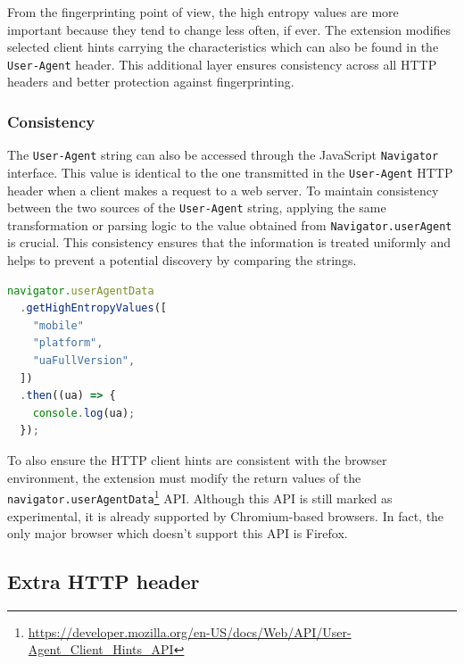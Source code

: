 From the fingerprinting point of view, the high entropy values are more important because they tend to change less often, if ever. The extension modifies selected client hints carrying the characteristics which can also be found in the \texttt{User-Agent} header. This additional layer ensures consistency across all HTTP headers and better protection against fingerprinting.

\subsubsection{Consistency}

The \texttt{User-Agent} string can also be accessed through the JavaScript \texttt{Navigator} interface. This value is identical to the one transmitted in the \texttt{User-Agent} HTTP header when a client makes a request to a web server. To maintain consistency between the two sources of the \texttt{User-Agent} string, applying the same transformation or parsing logic to the value obtained from \texttt{Navigator.userAgent} is crucial. This consistency ensures that the information is treated uniformly and helps to prevent a potential discovery by comparing the strings.

\bigbreak

\begin{lstlisting}[language={TypeScript}, caption={An example the User-Agent Client Hints API usage \cite{MDN}. This API call returns the same values as the HTTP client hints in example \ref{Listing:HTTPClientHintsExample}.}]
navigator.userAgentData
  .getHighEntropyValues([
    "mobile"
    "platform",
    "uaFullVersion",
  ])
  .then((ua) => {
    console.log(ua);
  });	
\end{lstlisting}

\medbreak

To also ensure the HTTP client hints are consistent with the browser environment, the extension must modify the return values of the \texttt{navigator.userAgentData}\footnote{\url{https://developer.mozilla.org/en-US/docs/Web/API/User-Agent_Client_Hints_API}} API. Although this API is still marked as experimental, it is already supported by Chromium-based browsers. In fact, the only major browser which doesn't support this API is Firefox.

\subsection{Extra HTTP header}
\label{SubSection:ExtraHTTPHeader}

